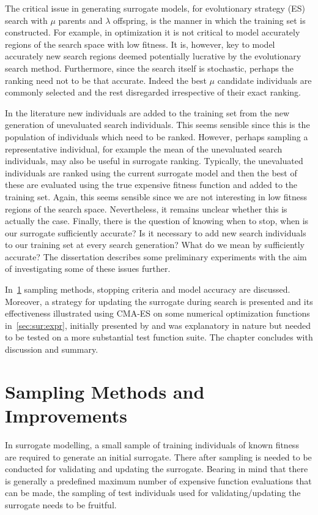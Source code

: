 The critical issue in generating surrogate models, for evolutionary strategy (ES) search \citep[cf.][]{Schwefel95:book} with $\mu$ parents and $\lambda$ offspring, is the manner in which the training set is constructed. For example, in optimization it is not critical to model accurately regions of the search space with low fitness. It is, however, key to model accurately new search regions deemed potentially lucrative by the evolutionary search method. Furthermore, since the search itself is stochastic, perhaps the ranking need not to be that accurate. Indeed the best $\mu$ candidate individuals are commonly selected and the rest disregarded irrespective of their exact ranking. 

In the literature new individuals are added to the training set from the new generation of unevaluated search individuals. This seems sensible since this is the population of individuals which need to be ranked. However, perhaps sampling a representative individual, for example the mean of the unevaluated search individuals, may also be useful in surrogate ranking. Typically, the unevaluated individuals  are ranked using the current surrogate model and then the best of these are evaluated using the true expensive fitness function and added to the training set. Again, this seems sensible since we are not interesting in low fitness regions of the search space. Nevertheless, it remains unclear whether this is actually the case. Finally, there is the question of knowing when to stop, when is our surrogate sufficiently accurate? Is it necessary to add new search individuals  to our training set at every search generation? What do we mean by sufficiently accurate? The dissertation describes some preliminary experiments with the aim of investigating some of these issues further.

In~\cref{sec:samplingstopping} sampling methods, stopping criteria and model accuracy are discussed. Moreover, a strategy for updating the surrogate during search is presented and its effectiveness illustrated using CMA-ES on some numerical optimization functions in~\cref{sec:sur:expr}, initially presented by \cite{InRu11b} and was explanatory in nature but needed to be tested on a more substantial test function suite. The chapter concludes with discussion and summary. %


\section{Sampling Methods and Improvements}\label{sec:samplingstopping}
In surrogate modelling, a small sample of training individuals of known fitness are required to generate an initial surrogate. There after sampling is needed to be conducted for validating and updating the surrogate. Bearing in mind that there is generally a predefined maximum number of expensive function evaluations that can be made, the sampling of test individuals  used for validating/updating the surrogate needs to be fruitful. 

